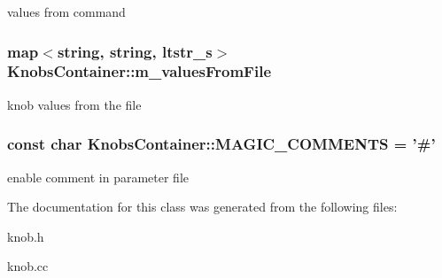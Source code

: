 \label{classKnobsContainer_acf9676b119cffbfdff8e7dfdd4d05f06}
values from command \hypertarget{classKnobsContainer_aba4b723d1bc4ccbdde44c979a373fcf4}{
\subsubsection[{m\_\-valuesFromFile}]{\setlength{\rightskip}{0pt plus 5cm}map$<$string, string, {\bf ltstr\_\-s}$>$ {\bf KnobsContainer::m\_\-valuesFromFile}}}
\label{classKnobsContainer_aba4b723d1bc4ccbdde44c979a373fcf4}
knob values from the file \hypertarget{classKnobsContainer_a2bbc43ebe779aad064691c495016b11c}{
\subsubsection[{MAGIC\_\-COMMENTS}]{\setlength{\rightskip}{0pt plus 5cm}const char {\bf KnobsContainer::MAGIC\_\-COMMENTS} = '\#'}}
\label{classKnobsContainer_a2bbc43ebe779aad064691c495016b11c}
enable comment in parameter file 

The documentation for this class was generated from the following files:\begin{DoxyCompactItemize}
\item 
knob.h\item 
knob.cc\end{DoxyCompactItemize}
